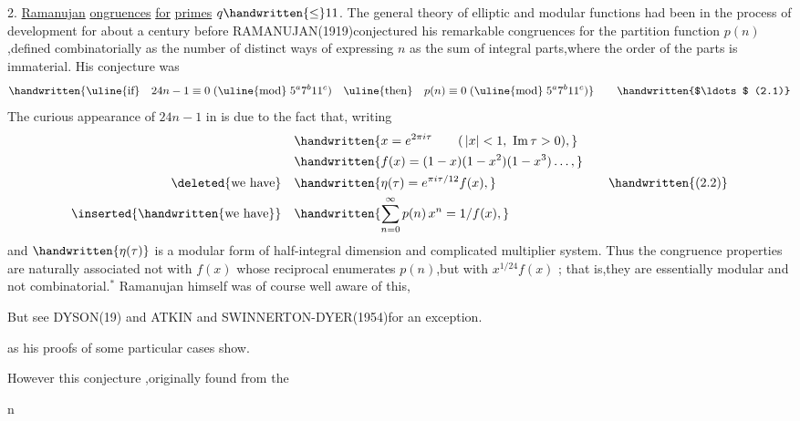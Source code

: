 \noindent\margin{\handwritten{/}}2. \uline{Ramanujan} \uline{ongruences} \uline{for} \uline{primes} $q\handwritten{\leq}11$. The general theory of elliptic and modular functions had been in the process of development for about a century before RAMANUJAN(1919)conjectured his remarkable congruences for the partition function \uline{$p(n)$},defined combinatorially as the number of distinct ways of expressing \uline{$n$} as the sum of integral parts,where the order of the parts is immaterial. His conjecture was
\[
\handwritten{\text{\uline{if}}\quad 24n-1\equiv0\;(\text{\uline{mod}}\;5^{a}7^{b}11^{c})\quad
\text{\uline{then}}\quad p(n)\equiv0\;(\text{\uline{mod}}\;5^{a}7^{b}11^{c})}
\tag*{\handwritten{$\ldots$ (2.1)}}
\]
The curious appearance of $24n-1$ in  is due to the fact that, writing
\[
\begin{aligned}
&\handwritten{x=e^{2\pi i\tau}\qquad (\,|x|<1,\ \mathrm{Im}\,\tau>0),}\\
&\handwritten{f(x)=(1-x)(1-x^{2})(1-x^{3})\ldots,}\\
\text{\deleted{we have}}\quad &\handwritten{\eta(\tau)=e^{\pi i\tau/12}f(x),}\\
\text{\inserted{\handwritten{we have}}}\quad &\handwritten{\sum_{n=0}^{\infty}p(n)\,x^{n}=1/f(x),}
\end{aligned}
\tag*{\handwritten{(2.2)}}
\]
and $\handwritten{\eta(\tau)}$ is a modular form of half-integral dimension and complicated multiplier system. Thus the congruence properties are naturally associated not with \uline{$f(x)$} whose reciprocal enumerates \uline{$p(n)$},but with \uline{$x^{1/24}f(x)$} ; that is,they are essentially modular and not combinatorial.$^{*}$ Ramanujan himself was of course well aware of this,

\noindent\handwritten{\rule{\linewidth}{0.4pt}}

\noindent{}

\noindent *But see DYSON(19) and ATKIN and SWINNERTON-DYER(1954)for an exception.

\noindent\handwritten{\rule{\linewidth}{0.4pt}}

\noindent as his proofs of some particular cases show.

However this conjecture ,originally found from the

\noindent\hfill {}n 

